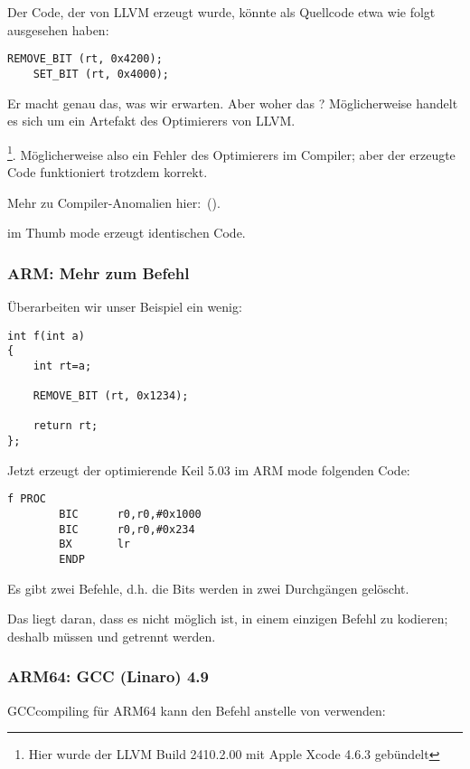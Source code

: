 Der Code, der von LLVM erzeugt wurde, könnte als Quellcode etwa wie folgt
ausgesehen haben:

\begin{lstlisting}[style=customc]
    REMOVE_BIT (rt, 0x4200);
    SET_BIT (rt, 0x4000);
\end{lstlisting}
Er macht genau das, was wir erwarten. Aber woher das ? Möglicherweise
handelt es sich um ein Artefakt des Optimierers von LLVM.

\footnote{Hier wurde der LLVM Build 2410.2.00 mit Apple Xcode 4.6.3 gebündelt}.
Möglicherweise also ein Fehler des Optimierers im Compiler; aber der erzeugte
Code funktioniert trotzdem korrekt.

Mehr zu Compiler-Anomalien hier:~().

\OptimizingXcodeIV im Thumb mode erzeugt identischen Code.

\subsubsection{ARM: Mehr zum Befehl }

Überarbeiten wir unser Beispiel ein wenig:

\begin{lstlisting}[style=customc]
int f(int a)
{
    int rt=a;

    REMOVE_BIT (rt, 0x1234);

    return rt;
};
\end{lstlisting}

Jetzt erzeugt der optimierende Keil 5.03 im ARM mode folgenden Code:

\begin{lstlisting}[style=customasmARM]
f PROC
        BIC      r0,r0,#0x1000
        BIC      r0,r0,#0x234
        BX       lr
        ENDP
\end{lstlisting}
Es gibt zwei  Befehle, d.h. die Bits  werden in zwei
Durchgängen gelöscht.

Das liegt daran, dass es nicht möglich ist,  in einem einzigen
 Befehl zu kodieren; deshalb müssen  und  getrennt
werden.

\subsubsection{ARM64: \Optimizing GCC (Linaro) 4.9}

\Optimizing GCCcompiling für ARM64 kann den Befehl \AND anstelle von
 verwenden:

